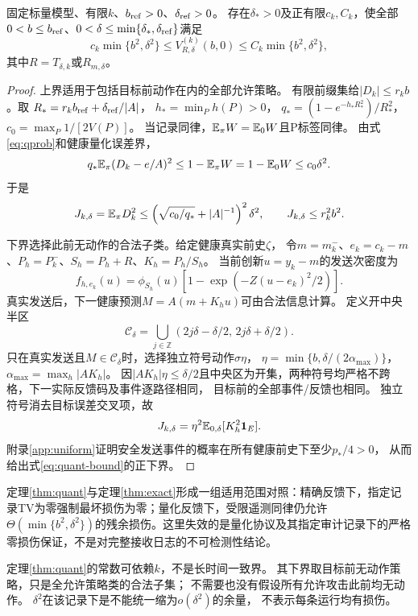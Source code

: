 \begin{theorem}[标量有限精度下的零TV残余损伤阶数]
\label{thm:quant}
固定标量模型、有限$k$、$b_{\rm ref}>0$、$\delta_{\rm ref}>0$。
存在$\delta_*>0$及正有限$c_k,C_k$，使全部
$0<b\le b_{\rm ref}$、$0<\delta\le\min\{\delta_*,\delta_{\rm ref}\}$满足
\begin{equation}
c_k\min\{b^2,\delta^2\}\le V_{R,\delta}^{(k)}(b,0)
\le C_k\min\{b^2,\delta^2\},
\label{eq:quant-bound}
\end{equation}
其中$R=T_{\delta,k}$或$R_{m,\delta}$。
\end{theorem}
\begin{proof}
上界适用于包括目标前动作在内的全部允许策略。
有限前缀集给$|D_k|\le r_kb$。取
$R_*=r_kb_{\rm ref}+\delta_{\rm ref}/|A|$，
$h_*=\min_Ph(P)>0$，
$q_*=(1-e^{-h_*R_*^2})/R_*^2$，
$c_0=\max_P1/[2V(P)]$。
当记录同律，$\mathbb E_\pi W=\mathbb E_0W$且P标签同律。
由式\eqref{eq:qprob}和健康量化误差界，
\[
q_*\mathbb E_\pi(D_k-e/A)^2\le1-\mathbb E_\pi W
=1-\mathbb E_0W\le c_0\delta^2.
\]
于是
\[
J_{k,\delta}=\mathbb E_\pi D_k^2
\le\left(\sqrt{c_0/q_*}+|A|^{-1}\right)^2\delta^2,
\qquad J_{k,\delta}\le r_k^2b^2 .
\]

下界选择此前无动作的合法子类。给定健康真实前史$\zeta$，
令$m=m_k^-$、$e_k=c_k-m$、$P_h=P_k^-$、$S_h=P_h+R$、$K_h=P_h/S_h$。
当前创新$u=y_k-m$的发送次密度为
\begin{equation}
f_{h,e_k}(u)=\phi_{S_h}(u)[1-\exp(-Z(u-e_k)^2/2)].
\label{eq:sentq}
\end{equation}
真实发送后，下一健康预测$M=A(m+K_hu)$可由合法信息计算。
定义开中央半区
\[
\mathcal C_\delta=\bigcup_{j\in\mathbb Z}
(2j\delta-\delta/2,\,2j\delta+\delta/2).
\]
只在真实发送且$M\in\mathcal C_\delta$时，选择独立符号动作$\sigma\eta$，
$\eta=\min\{b,\delta/(2\alpha_{\max})\}$，
$\alpha_{\max}=\max_h|AK_h|$。
因$|AK_h|\eta\le\delta/2$且中央区为开集，两种符号均严格不跨格，下一实际反馈码及事件逐路径相同，
目标前的全部事件/反馈也相同。
独立符号消去目标误差交叉项，故
\[
J_{k,\delta}=\eta^2\mathbb E_{0,\delta}[K_h^2\mathbf 1_E].
\]
附录\ref{app:uniform}证明安全发送事件的概率在所有健康前史下至少$p_*/4>0$，
从而给出式\eqref{eq:quant-bound}的正下界。
\end{proof}

定理\ref{thm:quant}与定理\ref{thm:exact}形成一组适用范围对照：精确反馈下，指定记录TV为零强制最坏损伤为零；量化反馈下，受限遥测同律仍允许$\Theta(\min\{b^2,\delta^2\})$的残余损伤。这里失效的是量化协议及其指定审计记录下的严格零损伤保证，不是对完整接收日志的不可检测性结论。

定理\ref{thm:quant}的常数可依赖$k$，不是长时间一致界。
其下界取目标前无动作策略，只是全允许策略类的合法子集；
不需要也没有假设所有允许攻击此前均无动作。
$\delta^2$在该记录下是不能统一缩为$o(\delta^2)$的余量，
不表示每条运行均有损伤。


